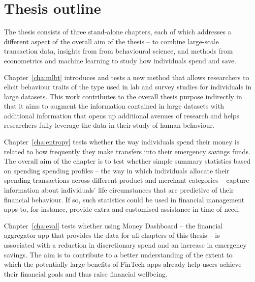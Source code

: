 
\section{Thesis outline}%
\label{sec:outline}

The thesis consists of three stand-alone chapters, each of which addresses a
different aspect of the overall aim of the thesis -- to combine large-scale
transaction data, insights from from behavioural science, and methods from
econometrics and machine learning to study how individuals spend and save. 

Chapter~\ref{cha:mlbt} introduces and tests a new method that allows
researchers to elicit behaviour traits of the type used in lab and survey
studies for individuals in large datasets. This work contributes to the overall
thesis purpose indirectly in that it aims to augment the information contained
in large datasets with additional information that opens up additional avenues
of research and helps researchers fully leverage the data in their study of
human behaviour.

Chapter~\ref{cha:entropy} tests whether the way individuals spend their money
is related to how frequently they make transfers into their emergency savings
funds. The overall aim of the chapter is to test whether simple summary
statistics based on spending spending profiles -- the way in which individuals
allocate their spending transactions across different product and merchant
categories -- capture information about individuals' life circumstances that
are predictive of their financial behaviour. If so, such statistics could be
used in financial management apps to, for instance, provide extra and
customised assistance in time of need.

Chapter~\ref{cha:eval} tests whether using Money Dashboard -- the financial
aggregator app that provides the data for all chapters of this thesis -- is
associated with a reduction in discretionary spend and an increase in emergency
savings. The aim is to contribute to a better understanding of the extent to
which the potentially large benefits of FinTech apps already help users achieve
their financial goals and thus raise financial wellbeing.
